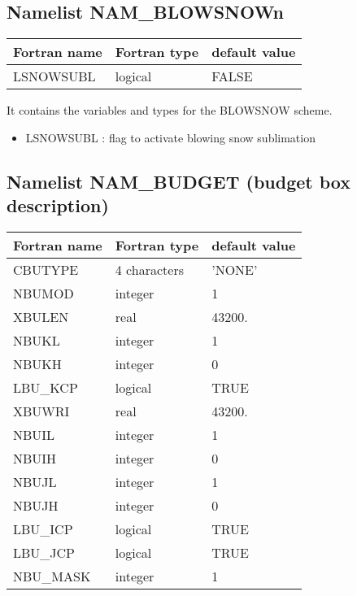 \subsection{Namelist NAM\_BLOWSNOWn }
\begin{center}
\begin{tabular} {|l|l|l|}
\hline
Fortran name & Fortran type & default value \\
\hline

LSNOWSUBL  & logical & FALSE     \\
\hline
\end{tabular}
\end{center}
It contains the variables and types for the BLOWSNOW scheme.

\begin{itemize}
\item  LSNOWSUBL : flag to activate blowing snow sublimation
\end{itemize}



\subsection{Namelist NAM\_BUDGET (budget box description)}
\label{ss:budget}

\begin{longtable} {|p{}|p{}|p{}|}
\hline
Fortran name &  Fortran type & default value \\
\hline 
\endhead
\hline
\endfoot
CBUTYPE   &  4 characters   & 'NONE'     \\
NBUMOD    & integer & 1        \\
XBULEN    & real    & 43200.   \\
NBUKL     & integer & 1        \\
NBUKH     & integer & 0        \\
LBU\_KCP  & logical & TRUE     \\
XBUWRI    & real    & 43200.   \\
NBUIL     & integer & 1        \\
NBUIH     & integer & 0        \\
NBUJL     & integer & 1        \\
NBUJH     & integer & 0        \\
LBU\_ICP  & logical & TRUE     \\
LBU\_JCP  & logical & TRUE     \\
NBU\_MASK & integer & 1 \\
\end{longtable}

